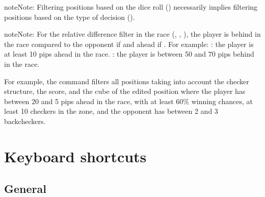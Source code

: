 \documentclass[letterpaper,10pt,english]{sphinxmanual}
\begin{document}
\begin{sphinxadmonition}{note}{Note:}
\sphinxAtStartPar
Filtering positions based on the dice roll () necessarily implies filtering positions based on the type of decision ().
\end{sphinxadmonition}

\begin{sphinxadmonition}{note}{Note:}
\sphinxAtStartPar
For the relative difference filter in the race (, , ), the player is behind in the race compared to the opponent if  and ahead if . For example: : the player is at least 10 pips ahead in the race. : the player is between 50 and 70 pips behind in the race.
\end{sphinxadmonition}

\sphinxAtStartPar
For example, the command  filters all positions taking into account the checker structure, the score, and the cube of the edited position where the player has between 20 and 5 pips ahead in the race, with at least 60\% winning chances, at least 10 checkers in the zone, and the opponent has between 2 and 3 backcheckers.

\sphinxstepscope


\section{Keyboard shortcuts}
\label{\detokenize{raccourcis:raccourcis-clavier}}\label{\detokenize{raccourcis:raccourcis}}\label{\detokenize{raccourcis::doc}}

\subsection{General}
\label{\detokenize{raccourcis:general}}\label{\detokenize{raccourcis:raccourcis-generaux}}
\end{document}
